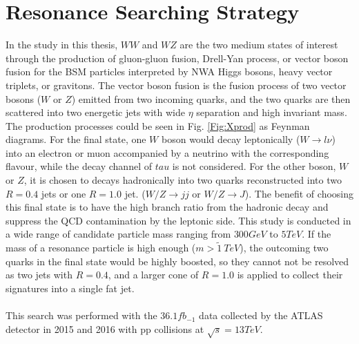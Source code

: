 \chapter{Resonance Searching Strategy}
In the study in this thesis, $WW$ and $WZ$ are the two medium states of interest through the production of gluon-gluon fusion, Drell-Yan process, or vector boson fusion for the BSM particles interpreted by NWA Higgs bosons, heavy vector triplets, or gravitons. The vector boson fusion is the fusion process of two vector bosons ($W$ or $Z$) emitted from two incoming quarks, and the two quarks are then scattered into two energetic jets with wide $\eta$ separation and high invariant mass. The production processes could be seen in Fig. \ref{Fig:Xprod} as Feynman diagrams. For the final state, one $W$ boson would decay leptonically ($W\rightarrow l\nu$) into an electron or muon accompanied by a neutrino with the corresponding flavour, while the decay channel of $tau$ is not considered. For the other boson, $W$ or $Z$,  it is chosen to decays hadronically into two quarks reconstructed into two $R=0.4$ jets or one $R=1.0$ jet. ($W/Z\rightarrow jj$ or $W/Z\rightarrow J$). The benefit of choosing this final state is to have the high branch ratio from the hadronic decay and suppress the QCD contamination by the leptonic side. This study is conducted in a wide range of candidate particle mass ranging from $300GeV$ to $5TeV$. If the mass of a resonance particle is high enough ($m>\tilde1~TeV$), the outcoming two quarks in the final state would be highly boosted, so they cannot not be resolved as two jets with $R=0.4$, and a larger cone of $R=1.0$ is applied to collect their signatures into a single fat jet. 
\\
\\This search was performed with the $36.1fb_{-1}$ data collected by the ATLAS detector in 2015 and 2016 with pp collisions at $\sqrt{s}=13TeV$. 

